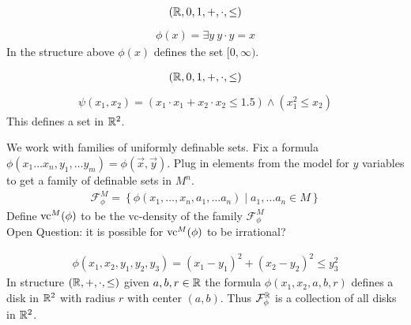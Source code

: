 \documentclass{beamer}
\newcommand{\F}{\mathcal F}
\newcommand{\curly}[1]{\left\{ #1 \right\}}
\begin{document}
\begin{frame}
	\begin{align*}
		(\mathbb{R}, 0, 1, +, \cdot, \leq)
	\end{align*}
	\begin{align*}
		\phi(x) = \exists y \ y \cdot y = x
	\end{align*}
	In the structure above $\phi(x)$ defines the set $[0, \infty)$.
\end{frame}

\begin{frame}
	\begin{align*}
		(\mathbb{R}, 0, 1, +, \cdot, \leq)
	\end{align*}
	\begin{align*}
		\psi(x_1, x_2) = (x_1 \cdot x_1 + x_2 \cdot x_2 \leq 1.5) \wedge (x_1^2 \leq x_2)
	\end{align*}
	This defines a set in $\mathbb{R}^2$.
\end{frame}

\begin{frame}
	We work with families of uniformly definable sets.
	Fix a formula $\phi(x_1 \ldots x_n, y_1, \ldots y_m) = \phi(\vec x, \vec y)$.
	Plug in elements from the model for $y$ variables to get a family of definable sets in $M^n$.
	\begin{align*}
		\F^M_\phi = \curly{\phi(x_1, \ldots, x_n, a_1, \ldots a_n) \mid a_1, \ldots a_n \in M}
	\end{align*}
	Define $\operatorname{vc}^M(\phi)$ to be the vc-density of the family $\F^M_\phi$ \\
	Open Question: it is possible for $\operatorname{vc}^M(\phi)$ to be irrational?
\end{frame}

\begin{frame}
	\begin{align*}
		\phi(x_1, x_2, y_1, y_2, y_3) = (x_1 - y_1)^2 + (x_2 - y_2)^2 \leq y_3^2
	\end{align*}
	In structure $(\mathbb{R}, +, \cdot, \leq)$ given $a,b,r \in \mathbb{R}$ the formula $\phi(x_1, x_2, a, b, r)$ defines a disk in $\mathbb{R}^2$ with radius $r$ with center $(a,b)$.
	Thus $\F^\R_\phi$ is a collection of all disks in $\mathbb{R}^2$.
\end{frame}
\end{document}
